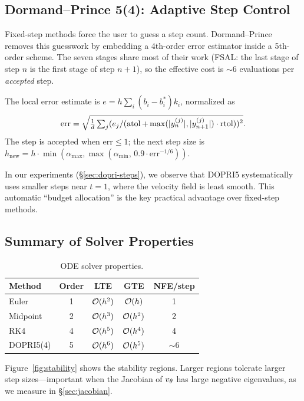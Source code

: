 \documentclass[11pt]{article}
\begin{document}
\subsection{Dormand--Prince 5(4): Adaptive Step Control}
\label{sec:dopri}

Fixed-step methods force the user to guess a step count.
Dormand--Prince~\citep{dormand1980family} removes this guesswork
by embedding a 4th-order error estimator inside a 5th-order scheme.
The seven stages share most of their work (FSAL: the last stage
of step $n$ is the first stage of step $n{+}1$), so the effective
cost is ${\sim}6$ evaluations per \emph{accepted} step.

The local error estimate is
$e = h\sum_i(b_i-b_i^*)k_i$,
normalized as
\begin{equation}
\label{eq:dopri-err}
\mathrm{err} = \sqrt{\tfrac{1}{d}\textstyle\sum_j
  (e_j/(\operatorname{atol}+\max(|y_n^{(j)}|,|y_{n+1}^{(j)}|)\cdot\operatorname{rtol}))^2}.
\end{equation}
The step is accepted when $\mathrm{err}\le1$; the next step
size is
$h_{\text{new}} = h\cdot\min(\alpha_{\max},
  \max(\alpha_{\min},\,0.9\cdot\mathrm{err}^{-1/6}))$.

In our experiments (\S\ref{sec:dopri-steps}), we observe that
DOPRI5 systematically uses smaller steps near $t{=}1$, where the
velocity field is least smooth.  This automatic ``budget
allocation'' is the key practical advantage over fixed-step methods.

\subsection{Summary of Solver Properties}

\begin{table}[h]
\centering
\caption{ODE solver properties.}
\label{tab:solvers}
\begin{tabular}{lcccc}
\toprule
\textbf{Method} & \textbf{Order} & \textbf{LTE} & \textbf{GTE} & \textbf{NFE/step}\\
\midrule
Euler      & 1 & $\mathcal{O}(h^2)$ & $\mathcal{O}(h)$   & 1\\
Midpoint   & 2 & $\mathcal{O}(h^3)$ & $\mathcal{O}(h^2)$ & 2\\
RK4        & 4 & $\mathcal{O}(h^5)$ & $\mathcal{O}(h^4)$ & 4\\
DOPRI5(4)  & 5 & $\mathcal{O}(h^6)$ & $\mathcal{O}(h^5)$ & ${\sim}6$\\
\bottomrule
\end{tabular}
\end{table}

Figure~\ref{fig:stability} shows the stability regions.  Larger
regions tolerate larger step sizes---important when the Jacobian
of $v_\theta$ has large negative eigenvalues, as we measure in
\S\ref{sec:jacobian}.
\end{document}
